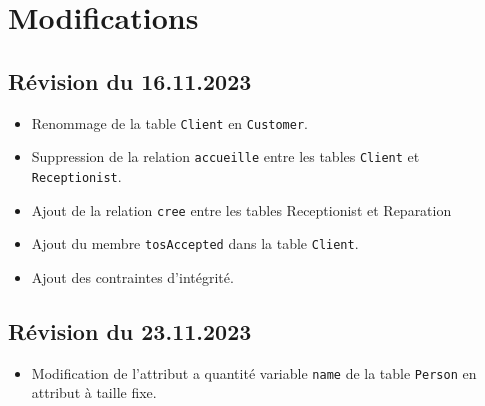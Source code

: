 \documentclass{article}
\begin{document}
\section{Modifications}

\subsection*{Révision du 16.11.2023}

\begin{itemize}
    \item Renommage de la table \texttt{Client} en \texttt{Customer}.
    \item Suppression de la relation \texttt{accueille} entre les tables \texttt{Client} et \texttt{Receptionist}.
    \item Ajout de la relation \texttt{cree} entre les tables {Receptionist} et {Reparation}
    \item Ajout du membre \texttt{tosAccepted} dans la table \texttt{Client}.
    \item Ajout des contraintes d'intégrité.
\end{itemize}

\subsection*{Révision du 23.11.2023}

\begin{itemize}
    \item Modification de l'attribut a quantité variable \texttt{name} de la table \texttt{Person} en attribut à taille fixe.
\end{itemize}
\end{document}
